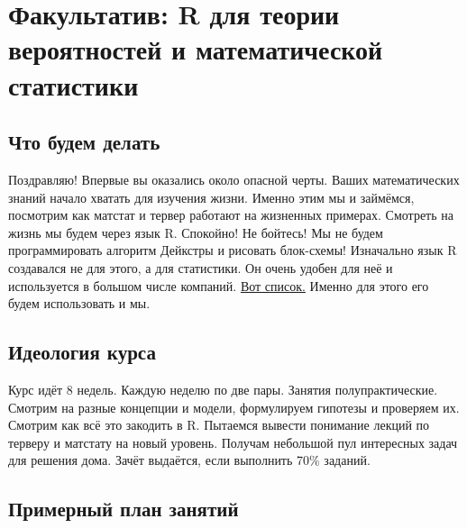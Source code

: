 \documentclass[12pt, a4paper, oneside]{article}
\begin{document}
\section*{Факультатив: R для теории вероятностей и математической статистики} 


\subsection*{Что будем делать}

Поздравляю! Впервые вы оказались около опасной черты. Ваших математических знаний начало хватать для изучения жизни. Именно этим мы и займёмся, посмотрим как матстат и тервер работают на жизненных примерах. Смотреть на жизнь мы будем через язык R. Спокойно! Не бойтесь! Мы не будем программировать алгоритм Дейкстры и рисовать блок-схемы! Изначально язык R создавался не для этого, а для статистики. Он очень удобен для неё и используется в большом числе компаний. \href{http://blog.revolutionanalytics.com/2014/05/companies-using-r-in-2014.html}{Вот список.} Именно для этого его будем использовать и мы. 


\subsection*{Идеология курса }

Курс идёт 8 недель. Каждую неделю по две пары. Занятия полупрактические. Смотрим на разные концепции и модели, формулируем гипотезы и проверяем их.  Смотрим как всё это закодить в R. Пытаемся вывести понимание лекций по терверу и матстату на новый уровень.  Получам небольшой  пул интересных задач для решения дома. Зачёт выдаётся, если выполнить 70\% заданий. 


\subsection*{ Примерный план занятий}
\end{document}
